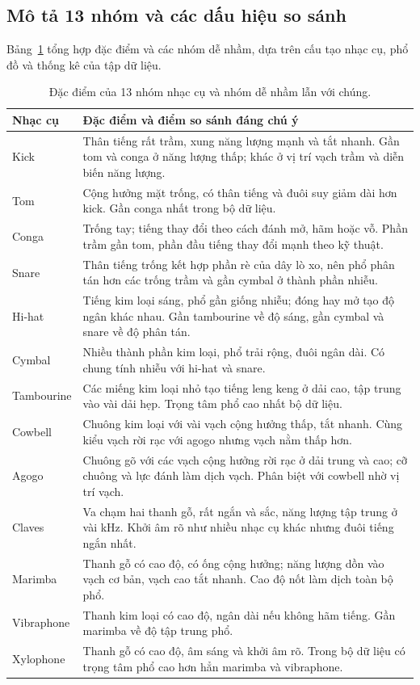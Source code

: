 \documentclass[11pt,a4paper]{article}
\begin{document}
\subsection{Mô tả 13 nhóm và các dấu hiệu so sánh}
Bảng~\ref{tab:mota} tổng hợp đặc điểm và các nhóm dễ nhầm, dựa trên cấu tạo nhạc cụ, phổ đồ và thống kê của tập dữ liệu.
\begin{table}[htbp]
\centering\small
\caption{Đặc điểm của 13 nhóm nhạc cụ và nhóm dễ nhầm lẫn với chúng.}\label{tab:mota}
\begin{tabularx}{\textwidth}{p{}X}
\toprule
Nhạc cụ & Đặc điểm và điểm so sánh đáng chú ý\\\midrule
Kick & Thân tiếng rất trầm, xung năng lượng mạnh và tắt nhanh. Gần tom và conga ở năng lượng thấp; khác ở vị trí vạch trầm và diễn biến năng lượng.\\
Tom & Cộng hưởng mặt trống, có thân tiếng và đuôi suy giảm dài hơn kick. Gần conga nhất trong bộ dữ liệu.\\
Conga & Trống tay; tiếng thay đổi theo cách đánh mở, hãm hoặc vỗ. Phần trầm gần tom, phần đầu tiếng thay đổi mạnh theo kỹ thuật.\\
Snare & Thân tiếng trống kết hợp phần rè của dây lò xo, nên phổ phân tán hơn các trống trầm và gần cymbal ở thành phần nhiễu.\\
Hi-hat & Tiếng kim loại sáng, phổ gần giống nhiễu; đóng hay mở tạo độ ngân khác nhau. Gần tambourine về độ sáng, gần cymbal và snare về độ phân tán.\\
Cymbal & Nhiều thành phần kim loại, phổ trải rộng, đuôi ngân dài. Có chung tính nhiễu với hi-hat và snare.\\
Tambourine & Các miếng kim loại nhỏ tạo tiếng leng keng ở dải cao, tập trung vào vài dải hẹp. Trọng tâm phổ cao nhất bộ dữ liệu.\\
Cowbell & Chuông kim loại với vài vạch cộng hưởng thấp, tắt nhanh. Cùng kiểu vạch rời rạc với agogo nhưng vạch nằm thấp hơn.\\
Agogo & Chuông gõ với các vạch cộng hưởng rời rạc ở dải trung và cao; cỡ chuông và lực đánh làm dịch vạch. Phân biệt với cowbell nhờ vị trí vạch.\\
Claves & Va chạm hai thanh gỗ, rất ngắn và sắc, năng lượng tập trung ở vài kHz. Khởi âm rõ như nhiều nhạc cụ khác nhưng đuôi tiếng ngắn nhất.\\
Marimba & Thanh gỗ có cao độ, có ống cộng hưởng; năng lượng dồn vào vạch cơ bản, vạch cao tắt nhanh. Cao độ nốt làm dịch toàn bộ phổ.\\
Vibraphone & Thanh kim loại có cao độ, ngân dài nếu không hãm tiếng. Gần marimba về độ tập trung phổ.\\
Xylophone & Thanh gỗ có cao độ, âm sáng và khởi âm rõ. Trong bộ dữ liệu có trọng tâm phổ cao hơn hẳn marimba và vibraphone.\\\bottomrule
\end{tabularx}
\end{table}
\end{document}
